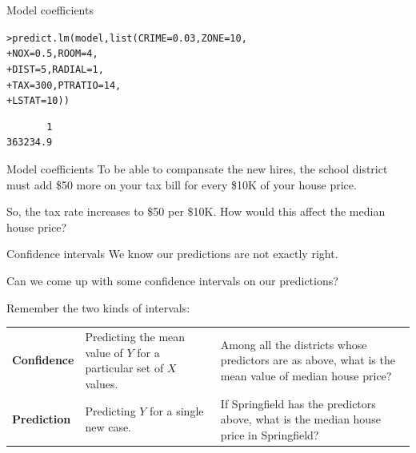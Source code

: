 \documentclass{beamer}\usepackage[]{graphicx}\usepackage[]{color}
\makeatletter
\newcommand{\hlnum}[1]{\textcolor[rgb]{0.824,0.412,0.118}{#1}}%
\newcommand{\hlstd}[1]{\textcolor[rgb]{1,0.894,0.769}{#1}}%
\newcommand{\hlkwc}[1]{\textcolor[rgb]{0.78,0.941,0.545}{#1}}%
\newcommand{\hlkwd}[1]{\textcolor[rgb]{1,0.78,0.769}{#1}}%
\newenvironment{kframe}{%
 \def\at@end@of@kframe{}%
 \ifinner\ifhmode%
  \def\at@end@of@kframe{\end{minipage}}%
  \begin{minipage}{\columnwidth}%
 \fi\fi%
 \def\FrameCommand##1{\hskip\@totalleftmargin \hskip-\fboxsep
 \colorbox{shadecolor}{##1}\hskip-\fboxsep
     \hskip-\linewidth \hskip-\@totalleftmargin \hskip\columnwidth}%
 \MakeFramed {\advance\hsize-\width
   \@totalleftmargin\z@ \linewidth\hsize
   \@setminipage}}%
 {\par\unskip\endMakeFramed%
 \at@end@of@kframe}
\newenvironment{knitrout}{}{} %
\makeatother
\begin{document}
\begin{darkframes}
\begin{frame}[fragile]{Model coefficients}
\begin{knitrout}
\begin{kframe}
\begin{alltt}
\hlstd{> }\hlkwd{predict.lm}\hlstd{(model,} \hlkwd{list}\hlstd{(}\hlkwc{CRIME}\hlstd{=}\hlnum{0.03}\hlstd{,} \hlkwc{ZONE}\hlstd{=}\hlnum{10}\hlstd{,}
\hlstd{+ }                       \hlkwc{NOX}\hlstd{=}\hlnum{0.5}\hlstd{,} \hlkwc{ROOM}\hlstd{=}\hlnum{4}\hlstd{,}
\hlstd{+ }                       \hlkwc{DIST}\hlstd{=}\hlnum{5}\hlstd{,}  \hlkwc{RADIAL}\hlstd{=}\hlnum{1}\hlstd{,}
\hlstd{+ }                       \hlkwc{TAX}\hlstd{=}\hlnum{300}\hlstd{,} \hlkwc{PTRATIO}\hlstd{=}\hlnum{14}\hlstd{,}
\hlstd{+ }                       \hlkwc{LSTAT}\hlstd{=}\hlnum{10}\hlstd{))}
\end{alltt}
\begin{verbatim}
       1 
363234.9 
\end{verbatim}
\end{kframe}
\end{knitrout}
    \end{frame}



    \begin{frame}[fragile]{Model coefficients}
      To be able to compansate the new hires, the school district must add \$50 more on your tax bill for every \$10K of your house price. \pause

      \bigskip
      So, the tax rate increases to \$50 per \$10K. How would this affect the median house price?

      \lc

    \end{frame}



    \begin{frame}[fragile]{Confidence intervals}
      We know our predictions are not exactly right.

      Can we come up with some confidence intervals on our predictions? \pause
      \bigskip

      Remember the two kinds of intervals:
      \bigskip

      \begin{tabular}{lp{1in}p{2in}}
        \textbf{Confidence} & Predicting the mean value of $Y$ for a particular  set of $X$ values. & Among all the districts whose predictors are as above, what is the mean value of median house price?  \\
        \textbf{Prediction} & Predicting $Y$ for a single new case. & If Springfield has the predictors above, what is the median house price in Springfield?\\
      \end{tabular}



\end{frame}
\end{darkframes}
\end{document}
